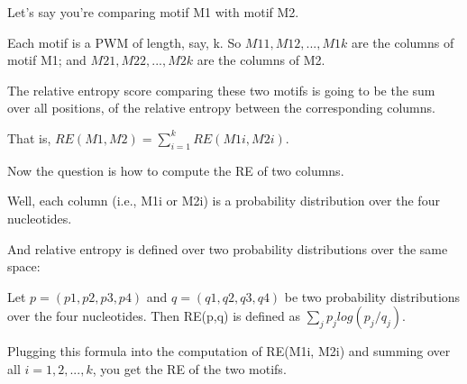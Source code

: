 \documentclass{article}
\author{Brett Jurgens}
\date{}
\begin{document}
    Let’s say you’re comparing motif M1 with motif M2.
    
    Each motif is a PWM of length, say, k. So $M11, M12, ..., M1k$
    are the columns of motif M1; and $M21, M22, ..., M2k$ are the columns of M2.
    
    The relative entropy score comparing these two motifs is going to be the sum over all positions, of
    the relative entropy between the corresponding columns.
    
    That is, $RE(M1,M2) = \sum_{i=1}^{k} RE(M1i, M2i)$.
    
    Now the question is how to compute the RE of two columns.
    
    Well, each column (i.e., M1i or M2i) is a probability distribution over the four nucleotides.
    
    And relative entropy is defined over two probability distributions over the same space:
    
    Let $p = (p1, p2, p3, p4)$ and $q = (q1, q2, q3, q4)$ be two probability distributions over the four
    nucleotides. Then RE(p,q) is defined as $\sum_j p_j log (p_j/q_j)$.
    
    Plugging this formula into the computation of RE(M1i, M2i) and summing over all $i = 1, 2, ..., k$,
    you get the RE of the two motifs.
\end{document}
